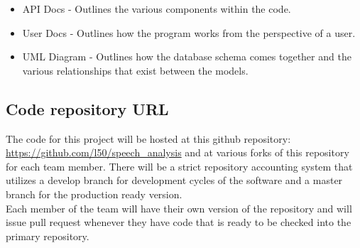 \documentclass[12pt, a4paper, oneside]{article}
\begin{document}
\begin{itemize}
\item API Docs - Outlines the various components within the code.
\item User Docs - Outlines how the program works from the perspective of a user.
\item UML Diagram - Outlines how the database schema comes together and the various relationships that exist between the models.
\end{itemize}

\subsection*{Code repository URL}
The code for this project will be hosted at this github repository: \url{https://github.com/l50/speech_analysis} and at various forks of this repository for each team member. There will be a strict repository accounting system that utilizes a develop branch for development cycles of the software and a master branch for the production ready version. \\

Each member of the team will have their own version of the repository and will issue pull request whenever they have code that is ready to be checked into the primary repository.
\end{document}
